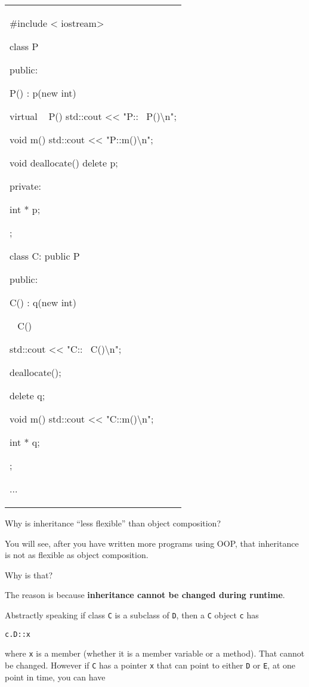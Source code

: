\begin{longtable}[]{@{}
  >{\raggedright\arraybackslash}p{}@{}}
\toprule\noalign{}
 \\
\midrule\noalign{}
\endhead
\bottomrule\noalign{}
\endlastfoot
\#include < iostream\textgreater{}

class P

{

public:

P() : p(new int) {}

\textbf{ }virtual ~ P() { std::cout <<{}
"P::~ P()\textbackslash n"; }

void m() { std::cout <<{} "P::m()\textbackslash n"; }

void deallocate() { delete p; }

private:

int * p;

};

class C: public P

{

public:

C() : q(new int) {}

~ C()

{

std::cout <<{} "C::~ C()\textbackslash n";

deallocate();

delete q;

}

void m() { std::cout <<{} "C::m()\textbackslash n"; }

int * q;

};

... \\
\end{longtable}

Why is inheritance ``less flexible'' than object composition?

You will see, after you have written more programs using OOP, that
inheritance is not as flexible as object composition.

Why is that?

The reason is because \textbf{inheritance cannot be changed during
runtime}.

Abstractly speaking if class \texttt{C} is a subclass of \texttt{D}, then a
\texttt{C} object \texttt{c} has

\texttt{c.D::x}

where \texttt{x} is a member (whether it is a member variable or a
method). That cannot be changed. However if \texttt{C} has a pointer
\texttt{x} that can point to either \texttt{D} or \texttt{E}, at one point in
time, you can have

